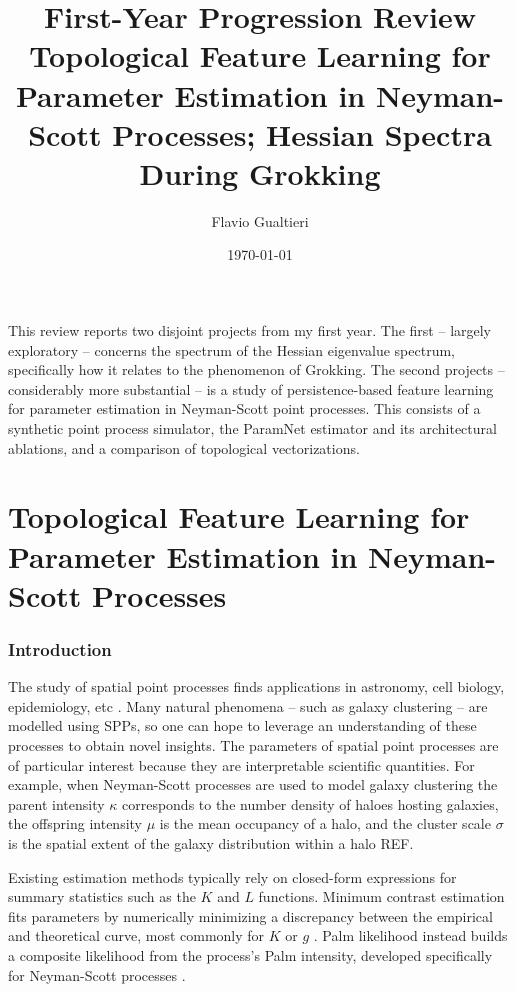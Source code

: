 \documentclass[11pt,a4paper]{article}
\title{First-Year Progression Review\\[4pt]
       \large Topological Feature Learning for Parameter Estimation in
       Neyman-Scott Processes; Hessian Spectra During Grokking}
\author{Flavio Gualtieri}
\date{\today}
\begin{document}
\maketitle

\noindent
This review reports two disjoint projects from my first year. The first -- largely exploratory -- concerns the spectrum of the Hessian eigenvalue spectrum, specifically how it relates to the phenomenon of Grokking. The second projects -- considerably more substantial --  is a study of persistence-based feature learning for parameter estimation in Neyman-Scott point processes. This consists of a synthetic point process simulator, the ParamNet estimator and its
architectural ablations, and a comparison of topological vectorizations. 

\part{Topological Feature Learning for Parameter Estimation in Neyman-Scott
Processes}

\section{Introduction}
\label{sec:intro}

The study of spatial point processes finds applications in astronomy, cell
biology, epidemiology, etc \citep{moller2004statistical}. Many natural phenomena
-- such as galaxy clustering -- are modelled using SPPs, so one can hope to
leverage an understanding of these processes to obtain novel insights. The
parameters of spatial point processes are of particular interest because they
are interpretable scientific quantities. For example, when Neyman-Scott
processes are used to model galaxy clustering the parent intensity $\kappa$
corresponds to the number density of haloes hosting galaxies, the offspring
intensity $\mu$ is the mean occupancy of a halo, and the cluster scale $\sigma$
is the spatial extent of the galaxy distribution within a halo REF.

Existing estimation methods typically rely on closed-form expressions for
summary statistics such as the $K$ and $L$ functions. Minimum contrast
estimation fits parameters by numerically minimizing a discrepancy between the
empirical and theoretical curve, most commonly for $K$ or $g$
\citep{diggle2003spatial}. Palm likelihood instead builds a composite likelihood
from the process's Palm intensity, developed specifically for Neyman-Scott
processes \citep{tanaka2008parameter}.
\end{document}
